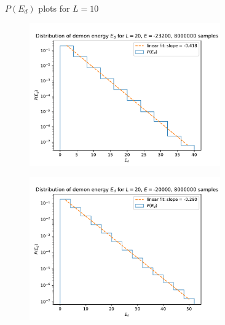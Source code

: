 \documentclass[11pt,a4paper]{article}
\begin{document}
\begin{figure}[b]
\begin{subfigure}{.5\textwidth}
	\end{subfigure}
	\caption[short]{$P(E_d)$ plots for $L=10$}
	\label{fig:1}
	\end{figure}



	\begin{figure}[b]
		\centering
		\begin{subfigure}{.5\textwidth}
			\centering
			\includegraphics[width=0.9\textwidth]{E_d_L20_E23200.pdf}
		\end{subfigure}%
		\begin{subfigure}{.5\textwidth}
			\centering
			\includegraphics[width=0.9\textwidth]{E_d_L20_E20000.pdf}
		\end{subfigure}
		\begin{subfigure}{.5\textwidth}
			\centering

\end{subfigure}
\end{figure}
\end{document}
